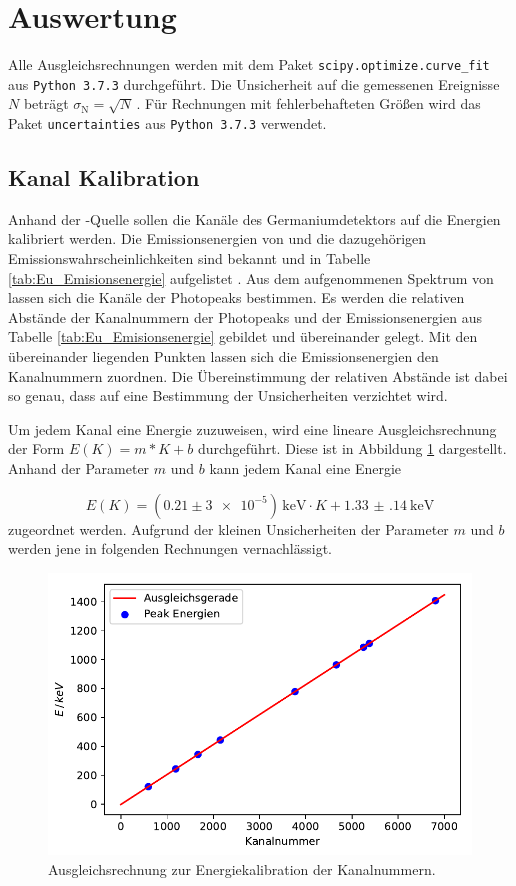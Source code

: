\section{Auswertung}

Alle Ausgleichsrechnungen werden mit dem Paket \texttt{scipy.optimize.curve\_fit}  aus \texttt{Python 3.7.3} durchgeführt.
Die Unsicherheit auf die gemessenen Ereignisse $N$ beträgt $\sigma_\text{N} = \sqrt{N}\,$.
Für Rechnungen mit fehlerbehafteten Größen wird das Paket \texttt{uncertainties} aus \texttt{Python 3.7.3} verwendet.

\subsection{Kanal Kalibration}

Anhand der -Quelle sollen die Kanäle des Germaniumdetektors auf die Energien kalibriert werden.
Die Emissionsenergien von  und die dazugehörigen Emissionswahrscheinlichkeiten sind bekannt und in Tabelle \ref{tab:Eu_Emisionsenergie} aufgelistet \cite{Eu_Emision}.
Aus dem aufgenommenen Spektrum von  lassen sich die Kanäle der Photopeaks bestimmen.
Es werden die relativen Abstände der Kanalnummern der Photopeaks und der Emissionsenergien aus Tabelle \ref{tab:Eu_Emisionsenergie} gebildet und übereinander gelegt.
Mit den übereinander liegenden Punkten lassen sich die Emissionsenergien den Kanalnummern zuordnen.
Die Übereinstimmung der relativen Abstände ist dabei so genau, dass auf eine Bestimmung der Unsicherheiten verzichtet wird.

Um jedem Kanal eine Energie zuzuweisen, wird eine lineare Ausgleichsrechnung der Form $E(K) = m*K+b$ durchgeführt.
Diese ist in Abbildung \ref{fig:Channel_Kalibration} dargestellt.
Anhand der Parameter $m$ und $b$ kann jedem Kanal eine Energie

\begin{equation}
  E(K) = (0.21 \pm \num{3e-5})\,\si{\kilo\electronvolt} \cdot K + \SI{1.33(14)}{\kilo\electronvolt}
  \label{channel_kal}
\end{equation}
zugeordnet werden.
Aufgrund der kleinen Unsicherheiten der Parameter $m$ und $b$ werden jene in folgenden Rechnungen vernachlässigt.

\begin{figure}[H]
  \centering
  \includegraphics[width = .7\textwidth]{../Plots/Channel_Kalibration.pdf}
  \caption{Ausgleichsrechnung zur Energiekalibration der Kanalnummern.}
  \label{fig:Channel_Kalibration}
\end{figure}

